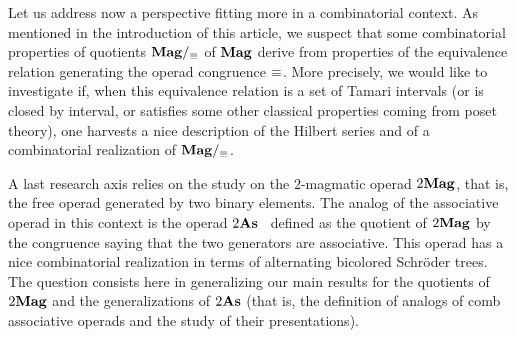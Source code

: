 Let us address now a perspective fitting more in a combinatorial
context. As mentioned in the introduction of this article, we suspect
that some combinatorial properties of quotients $\mathbf{Mag}/_{\operatorname{\equiv}}$ of
$\mathbf{Mag}$ derive from properties of the equivalence relation generating the
operad congruence $\operatorname{\equiv}$. More precisely, we would like to investigate
if, when this equivalence relation is a set of Tamari intervals (or is
closed by interval, or satisfies some other classical properties coming
from poset theory), one harvests a nice description of the Hilbert
series and of a combinatorial realization of $\mathbf{Mag}/_{\operatorname{\equiv}}$.
\medbreak

A last research axis relies on the study on the $2$-magmatic operad
$2\mathbf{Mag}$, that is, the free operad generated by two binary elements.
The analog of the associative operad in this context is the operad
$2\mathbf{As}$~\cite{LR06} defined as the quotient of $2\mathbf{Mag}$ by the
congruence saying that the two generators are associative. This operad
has a nice combinatorial realization in terms of alternating bicolored
Schröder trees. The question consists here in generalizing our main
results for the quotients of $2\mathbf{Mag}$ and the generalizations of
$2\mathbf{As}$ (that is, the definition of analogs of comb associative operads
and the study of their presentations).
\medbreak

